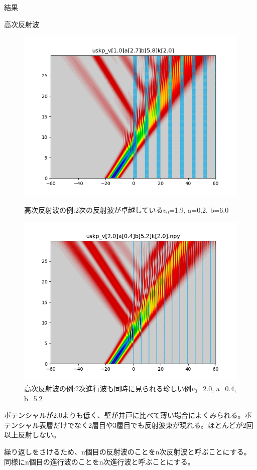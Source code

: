 \documentclass[a4paper, lualatex]{bxjsarticle}
\begin{document}
\begin{section}{結果}
\begin{subsection}{高次反射波}
\begin{figure}[h]
\begin{minipage}{0.5\hsize}
            \centering
            \includegraphics[width=0.9\hsize]{tajuhan3.png}
            \caption{高次反射波の例:2次の反射波が卓越している$v_0$=1.9, a=0.2, b=6.0}
        \end{minipage}
        \begin{minipage}{0.5\hsize}
            \centering
            \includegraphics[width=0.9\hsize]{tajuhan4.png}
            \caption{高次反射波の例:2次進行波も同時に見られる珍しい例$v_0$=2.0, a=0.4, b=5.2}
        \end{minipage}
    \end{figure}
    \par ポテンシャルが$2.0$よりも低く、壁が井戸に比べて薄い場合によくみられる。ポテンシャル表層だけでなく2層目や3層目でも反射波束が現れる。ほとんどが2回以上反射しない。
    \par 繰り返しをさけるため、n個目の反射波のことをn次反射波と呼ぶことにする。同様にn個目の進行波のことをn次進行波と呼ぶことにする。

\end{subsection}
\end{section}
\end{document}
